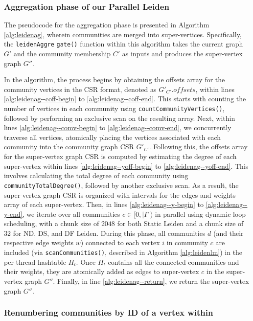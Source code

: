 \subsubsection{Aggregation phase of our Parallel Leiden}

The pseudocode for the aggregation phase is presented in Algorithm \ref{alg:leidenag}, wherein communities are merged into super-vertices. Specifically, the \texttt{leidenAggre} \texttt{gate()} function within this algorithm takes the current graph $G'$ and the community membership $C'$ as inputs and produces the super-vertex graph $G''$.

In the algorithm, the process begins by obtaining the offsets array for the community vertices in the CSR format, denoted as $G'_{C'}.offsets$, within lines \ref{alg:leidenag--coff-begin} to \ref{alg:leidenag--coff-end}. This starts with counting the number of vertices in each community using \texttt{countCommunityVertices()}, followed by performing an exclusive scan on the resulting array. Next, within lines \ref{alg:leidenag--comv-begin} to \ref{alg:leidenag--comv-end}, we concurrently traverse all vertices, atomically placing the vertices associated with each community into the community graph CSR $G'_{C'}$. Following this, the offsets array for the super-vertex graph CSR is computed by estimating the degree of each super-vertex within lines \ref{alg:leidenag--yoff-begin} to \ref{alg:leidenag--yoff-end}. This involves calculating the total degree of each community using \texttt{communityTotalDegree()}, followed by another exclusive scan. As a result, the super-vertex graph CSR is organized with intervals for the edges and weights array of each super-vertex. Then, in lines \ref{alg:leidenag--y-begin} to \ref{alg:leidenag--y-end}, we iterate over all communities $c \in [0, |\Gamma|)$ in parallel using dynamic loop scheduling, with a chunk size of $2048$ for both Static Leiden and a chunk size of $32$ for ND, DS, and DF Leiden. During this phase, all communities $d$ (and their respective edge weights $w$) connected to each vertex $i$ in community $c$ are included (via \texttt{scanCommunities()}, described in Algorithm \ref{alg:leidenlm}) in the per-thread hashtable $H_t$. Once $H_t$ contains all the connected communities and their weights, they are atomically added as edges to super-vertex $c$ in the super-vertex graph $G''$. Finally, in line \ref{alg:leidenag--return}, we return the super-vertex graph $G''$.




\subsubsection{Renumbering communities by ID of a vertex within}

